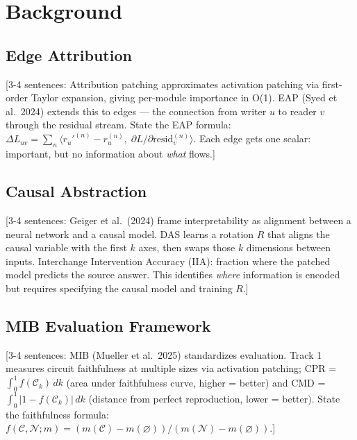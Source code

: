 \documentclass[11pt]{article}
\begin{document}

\section{Background}



\subsection{Edge Attribution}

[3-4 sentences: Attribution patching approximates activation patching
via first-order Taylor expansion, giving per-module importance in O(1).
EAP (Syed et al.\ 2024) extends this to edges --- the connection from
writer $u$ to reader $v$ through the residual stream.
State the EAP formula:
$\Delta L_{uv} = \sum_n \langle r_u'^{(n)} - r_u^{(n)},\;
\partial L / \partial \text{resid}_v^{(n)} \rangle$.
Each edge gets one scalar: important, but no information about
\emph{what} flows.]

\subsection{Causal Abstraction}

[3-4 sentences: Geiger et al.\ (2024) frame interpretability as alignment
between a neural network and a causal model. DAS learns a rotation $R$
that aligns the causal variable with the first $k$ axes, then swaps those
$k$ dimensions between inputs. Interchange Intervention Accuracy (IIA):
fraction where the patched model predicts the source answer. This
identifies \emph{where} information is encoded but requires specifying
the causal model and training $R$.]

\subsection{MIB Evaluation Framework}

[3-4 sentences: MIB (Mueller et al.\ 2025) standardizes evaluation.
Track 1 measures circuit faithfulness at multiple sizes via activation
patching; CPR = $\int_0^1 f(\mathcal{C}_k)\,dk$ (area under faithfulness
curve, higher = better) and CMD = $\int_0^1 |1 - f(\mathcal{C}_k)|\,dk$
(distance from perfect reproduction, lower = better).
State the faithfulness formula:
$f(\mathcal{C}, \mathcal{N}; m) = (m(\mathcal{C}) - m(\varnothing)) /
(m(\mathcal{N}) - m(\varnothing))$.]
\end{document}
